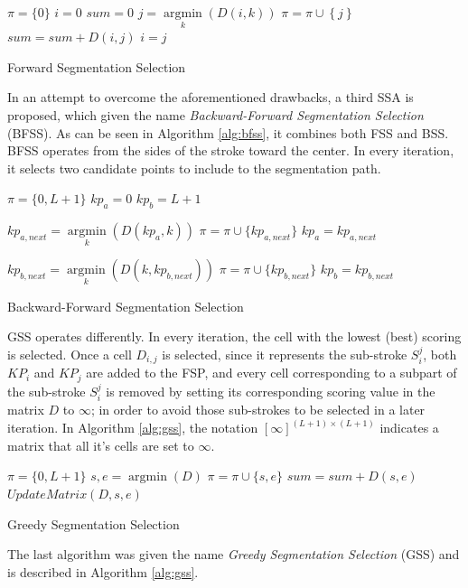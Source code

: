 \documentclass[10pt, conference, compsocconf]{IEEEtran}
\begin{document}
\begin{algorithm}
$\pi = \{0\} $\;
$i=0$\;
$sum=0$\;
{
	$j = \mathop {\arg \min }\limits_k \left( {D\left( {i,k} \right)} \right)$\;
	$\pi = \pi \cup \left\{ j \right\}$\;
	$sum = sum + D\left( {i,j} \right)$\;
	$i=j$\;
}
\caption{Forward Segmentation Selection}
\label{alg:fss}
\end{algorithm}

In an attempt to overcome the aforementioned drawbacks, a third SSA is proposed, which given the name \emph{Backward-Forward Segmentation Selection} (BFSS). 
As can be seen in Algorithm \ref{alg:bfss}, it combines both FSS and BSS.
BFSS operates from the sides of the stroke toward the center. In every iteration, it selects two candidate points to include to the segmentation path.

\begin{algorithm}
$\pi = \{0,L+1\}$\;
$kp_{a}=0$\;
$kp_{b}=L+1$\;
{
	$kp_{a,next} = \mathop {\arg \min}\limits_k (D(kp_a,k))$\;
	$\pi = \pi \cup \{kp_{a,next}\}$\;
	$kp_{a}=kp_{a,next}$\;
	
	$kp_{b,next} = \mathop {\arg \min}\limits_k (D(k,kp_{b,next}))$\;
	$\pi = \pi \cup \{kp_{b,next}\}$\;	
	$kp_{b}=kp_{b,next}$\;
}
\caption{Backward-Forward Segmentation Selection}
\label{alg:bfss}
\end{algorithm}

GSS operates differently. In every iteration, the cell with the lowest (best) scoring is selected. 
Once a cell $D_{i,j}$ is selected, since it represents the sub-stroke $S_{i}^{j}$, both $KP_{i}$ and $KP_{j}$ are added to the FSP, and every cell corresponding to a subpart of the sub-stroke $S_{i}^{j}$ is removed by setting its corresponding scoring value in the matrix $D$ to $\infty$; in order to avoid those sub-strokes to be selected in a later iteration. In Algorithm \ref{alg:gss}, the notation $[\infty]^{(L+1)\times (L+1)}$ indicates a matrix that all it's cells are set to $\infty$.

\begin{algorithm}
$\pi = \{0,L+1\}$\;
{
	${s,e} = \mathop {\arg \min}(D)$\;
	$\pi = \pi \cup \{s,e\}$\;
	$sum = sum + D(s,e)$\;
	$UpdateMatrix(D,s,e)$\;
}
\caption{Greedy Segmentation Selection}
\label{alg:gss}
\end{algorithm}

The last algorithm was given the name \emph{Greedy Segmentation Selection} (GSS) and is described in Algorithm \ref{alg:gss}.
\end{document}
